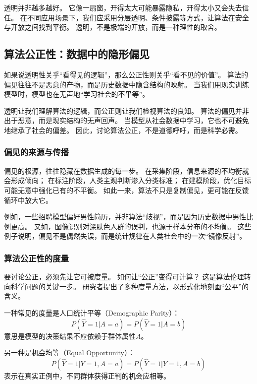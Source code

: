透明并非越多越好。
它像一扇窗，开得太大可能暴露隐私，开得太小又会失去信任。
在不同应用场景下，我们应采用分层透明、条件披露等方式，让算法在安全与开放之间找到平衡。
透明，不是极端的开放，而是一种理性的取舍。

\subsection{算法公正性：数据中的隐形偏见}

如果说透明性关乎“看得见的逻辑”，那么公正性则关乎“看不见的价值”。
算法的偏见往往不是恶意的产物，而是历史数据中隐含结构的映射。
当我们用现实训练模型时，模型也在无声地“学习社会的不平等”。

透明让我们理解算法的逻辑，而公正则让我们检视算法的良知。
算法的偏见并非出于恶意，而是现实结构的无声回声。
当模型从社会数据中学习，它也不可避免地继承了社会的偏差。
因此，讨论算法公正，不是道德呼吁，而是科学必需。

\subsubsection{偏见的来源与传播}

偏见的根源，往往隐藏在数据生成的每一步。
在采集阶段，信息来源的不均衡就会形成倾向；
在标注阶段，人类主观判断渗入分类标准；
在建模阶段，优化目标可能无意中强化已有的不平衡。
如此一来，算法不只是复制偏见，更可能在反馈循环中放大它。

例如，一些招聘模型偏好男性简历，并非算法“歧视”，而是因为历史数据中男性比例更高。
又如，图像识别对深肤色人群的误判，也源于样本分布的不均衡。
这些例子说明，偏见不是偶然失误，而是统计规律在人类社会中的一次“镜像反射”。

\subsubsection{算法公正性的度量}

要讨论公正，必须先让它可被度量。
如何让“公正”变得可计算？
这是算法伦理转向科学问题的关键一步。
研究者提出了多种度量方法，以形式化地刻画“公平”的含义。

一种常见的度量是人口统计平等（Demographic Parity）：
\begin{equation}
P(\hat{Y}=1|A=a) = P(\hat{Y}=1|A=b)
\end{equation}
意思是模型的决策结果不应依赖于群体属性$A$。

另一种是机会均等（Equal Opportunity）：
\begin{equation}
P(\hat{Y}=1|Y=1, A=a) = P(\hat{Y}=1|Y=1, A=b)
\end{equation}
表示在真实正例中，不同群体获得正判的机会应相等。

